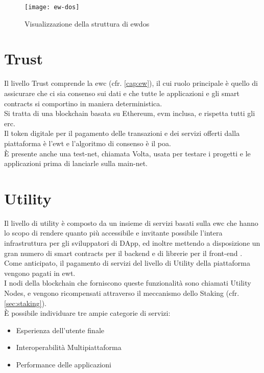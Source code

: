 \begin{figure}[h]
    \texttt{[image: ew-dos]}
    \centering
    \caption{Visualizzazione della struttura di \gls{ewdos} \cite{img:ew-dos}}
    \label{lab:ew-dos}
\end{figure}

\section{Trust}
Il livello Trust comprende la \gls{ewc} (cfr. \autoref{cap:ew}), 
il cui ruolo principale è quello di assicurare che ci sia consenso sui dati e che tutte le applicazioni e gli smart contracts si comportino in maniera deterministica. \\
Si tratta di una blockchain basata su Ethereum, \gls{evm} inclusa, e rispetta tutti gli \gls{erc}. \\
Il token digitale per il pagamento delle transazioni e dei servizi offerti dalla piattaforma è l'\gls{ewt} e l'algoritmo di consenso è il \gls{poa}. \\
È presente anche una test-net, chiamata Volta, usata per testare i progetti e le applicazioni prima di lanciarle sulla main-net. 

\section{Utility}
Il livello di utility è composto da un insieme di servizi basati sulla \gls{ewc} che hanno lo scopo di rendere quanto più accessibile e invitante possibile l'intera infrastruttura per gli sviluppatori di DApp,
ed inoltre mettendo a disposizione un gran numero di smart contracts per il backend e di librerie per il front-end \cite{art:ew-dos}. \\
Come anticipato, il pagamento di servizi del livello di Utility della piattaforma vengono pagati in \gls{ewt}. \\
I nodi della blockchain che forniscono queste funzionalità sono chiamati Utility Nodes, e vengono ricompensati attraverso il meccanismo dello Staking (cfr. \autoref{sec:staking}).\\

È possibile individuare tre ampie categorie di servizi:
\begin{itemize}
    \item Esperienza dell'utente finale
    \item Interoperabilità Multipiattaforma
    \item Performance delle applicazioni
\end{itemize}

